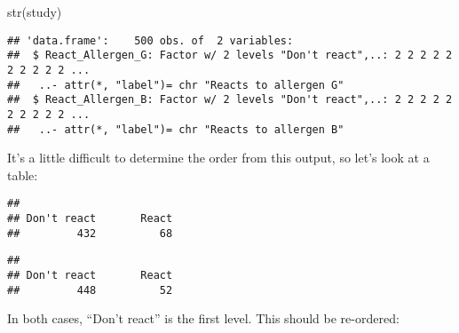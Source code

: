 \documentclass[
]{memoir}
\newenvironment{Shaded}{\begin{snugshade}}{\end{snugshade}}
\newcommand{\AttributeTok}[1]{\textcolor[rgb]{0.77,0.63,0.00}{#1}}
\newcommand{\FunctionTok}[1]{\textcolor[rgb]{0.00,0.00,0.00}{#1}}
\newcommand{\NormalTok}[1]{#1}
\newcommand{\OtherTok}[1]{\textcolor[rgb]{0.56,0.35,0.01}{#1}}
\newcommand{\SpecialCharTok}[1]{\textcolor[rgb]{0.00,0.00,0.00}{#1}}
\newcommand{\StringTok}[1]{\textcolor[rgb]{0.31,0.60,0.02}{#1}}
\begin{document}
\begin{Shaded}
\begin{Highlighting}[]
\FunctionTok{str}\NormalTok{(study)}
\end{Highlighting}
\end{Shaded}

\begin{verbatim}
## 'data.frame':    500 obs. of  2 variables:
##  $ React_Allergen_G: Factor w/ 2 levels "Don't react",..: 2 2 2 2 2 2 2 2 2 2 ...
##   ..- attr(*, "label")= chr "Reacts to allergen G"
##  $ React_Allergen_B: Factor w/ 2 levels "Don't react",..: 2 2 2 2 2 2 2 2 2 2 ...
##   ..- attr(*, "label")= chr "Reacts to allergen B"
\end{verbatim}

It's a little difficult to determine the order from this output, so let's look at a table:

\begin{Shaded}
\end{Shaded}

\begin{verbatim}
## 
## Don't react       React 
##         432          68
\end{verbatim}

\begin{Shaded}
\end{Shaded}

\begin{verbatim}
## 
## Don't react       React 
##         448          52
\end{verbatim}

In both cases, ``Don't react'' is the first level. This should be re-ordered:

\begin{Shaded}
\end{Shaded}
\end{document}
